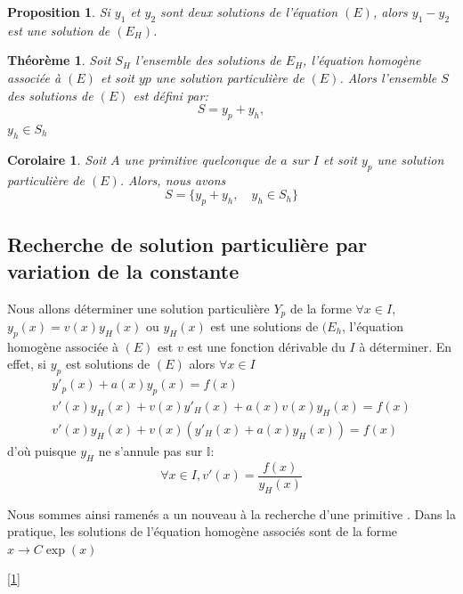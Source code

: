 \documentclass[12pt]{article}
\newtheorem{theo}{Théorème}
\newtheorem{prop}{Proposition}
\newtheorem{coro}{Corolaire}
\begin{document}
\begin{prop}
Si $y_{1}$ et $y_{2}$ sont deux solutions de l'équation $(E)$, alors $y_{1}-y_{2}$ est une solution de $(E_{H})$.
\end{prop}


\begin{theo}
Soit $S_{H}$ l'ensemble des solutions de $E_{H}$, l'équation homogène associée à $(E)$ et soit $yp$ une solution particulière de $(E)$.
Alors l'ensemble $S$ des solutions de $(E)$ est défini par: 
$$ S=y_{p}+y_{h},$$\quad $y_{h} \in S_{h}$
\end{theo}


\begin{coro}
Soit $A$ une primitive quelconque de $a$ sur $I$ et soit $y_{p}$ une solution particulière de $(E)$. Alors, nous avons 
\begin{equation}
 S = \{y_{p} +y_{h},\quad y_{h} \in S_{h}\}
\end{equation} 
\end{coro}



\subsection{Recherche de solution particulière par variation de la constante}

Nous allons déterminer une solution particulière $Y_{p}$ de la forme $ \forall x\in I,$ \qquad$ y_{p}(x)= v(x)y_{H}(x)$
ou $y_{H}(x)$ est une solutions de $(E_{h}$, l'équation homogène associée à $(E)$ est $v$ est une fonction dérivable du $I$ à déterminer.\newline
En effet, si $y_{p}$ est solutions de $(E)$ alors $\forall x \in I$
\begin{align}
y'_{p}(x)+ a(x)y_{p}(x)=f(x)
\\v'(x)y_{H}(x)+ v(x)y'_{H}(x) + a(x)v(x)y_{H}(x) = f(x) 
\\v'(x)y_{H}(x)+ v(x)( y'_{H}(x)+ a(x)y_{H}(x))=f(x)
\end{align}
d'où puisque $y_{H}$ ne s'annule pas sur $\mathbb{I}$:
\begin{equation}
\forall x \in I,  v'(x)=\frac{f(x)}{y_{H}(x)}
\end{equation}

Nous sommes ainsi ramenés a un nouveau à la recherche d'une primitive .
Dans la pratique, les solutions de l'équation homogène associés sont de la forme $x\longrightarrow C \exp(x) $


\eqref{1}























\end{document}
